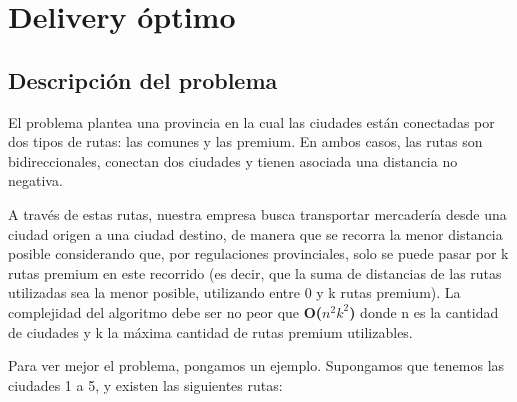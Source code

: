 \section{Delivery óptimo}


\subsection{Descripción del problema}
El problema plantea una provincia en la cual las ciudades están conectadas por dos tipos de rutas: las comunes y las premium. En ambos casos, las rutas son bidireccionales, conectan dos ciudades y tienen asociada una distancia no negativa.

A través de estas rutas, nuestra empresa busca transportar mercadería desde una ciudad origen a una ciudad destino, de manera que se recorra la menor distancia posible considerando que, por regulaciones provinciales, solo se puede pasar por k rutas premium en este recorrido (es decir, que la suma de distancias de las rutas utilizadas sea la menor posible, utilizando entre 0 y k rutas premium). La complejidad del algoritmo debe ser no peor que \textbf{O($n^2k^2$)} donde n es la cantidad de ciudades y k la máxima cantidad de rutas premium utilizables.

Para ver mejor el problema, pongamos un ejemplo. Supongamos que tenemos las ciudades 1 a 5, y existen las siguientes rutas:

\bigskip


